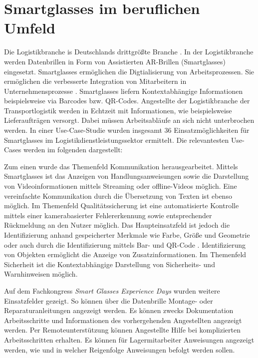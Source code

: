 \section{Smartglasses im beruflichen Umfeld} 
Die Logistikbranche is Deutschlands drittgrößte Branche \cite{Zobel2016}. In der Logistikbranche werden Datenbrillen in Form von Assistierten AR-Brillen (Smartglasses) eingesetzt. Smartglasses ermöglichen die Digtialisierung von Arbeitsprozessen. Sie ermöglichen die verbesserte Integration von Mitarbeitern in Unternehmensprozesse \cite{Zobel2016}. Smartglasses liefern Kontextabhängige Informationen beispielsweise via Barcodes bzw. QR-Codes. Angestellte der Logistikbranche der Transportlogistik werden in Echtzeit mit Informationen, wie beispielsweise Lieferaufträgen versorgt. Dabei müssen Arbeitsabläufe an sich nicht unterbrochen werden. In einer Use-Case-Studie \cite{Niemoller2017} wurden insgesamt 36 Einsatzmöglichkeiten für Smartglasses im Logistikdienstleistungssektor ermittelt. Die relevantesten Use-Cases werden im folgenden dargestellt:

Zum einen wurde das Themenfeld Kommunikation herausgearbeitet. Mittels Smartglasses ist das Anzeigen von Handlungsanweisungen sowie die Darstellung von Videoinformationen mittels Streaming oder offline-Videos möglich. Eine vereinfachte Kommunikation durch die Übersetzung von Texten ist ebenso möglich. Im Themenfeld Qualitätssicherung ist eine automatisierte Kontrolle mittels einer kamerabasierter Fehlererkennung sowie entsprechender Rückmeldung an den Nutzer möglich. Das Haupteinsatzfeld ist jedoch die Identifizierung anhand gespeicherter Merkmale wie Farbe, Größe und Geometrie oder auch durch die Identifizierung mittels Bar- und QR-Code \cite{Niemoller2017}. Identifizierung von Objekten ermöglicht die Anzeige von Zusatzinformationen. Im Themenfeld Sicherheit ist die Kontextabhängige Darstellung von Sicherheits- und Warnhinweisen möglich. 

Auf dem Fachkongress \emph{Smart Glasses Experience Days} \cite{Manokaran-Pathamathan2017} wurden weitere Einsatzfelder gezeigt. So können über die Datenbrille Montage- oder Reparaturanleitungen angezeigt werden. Es können zwecks Dokumentation Arbeitsschritte und Informationen des vorhergehenden Angestellten angezeigt werden. Per Remoteunterstützung können Angestellte Hilfe bei komplizierten Arbeitsschritten erhalten. Es können für Lagermitarbeiter Anweisungen angezeigt werden, wie und in welcher Reigenfolge Anweisungen befolgt werden sollen.

